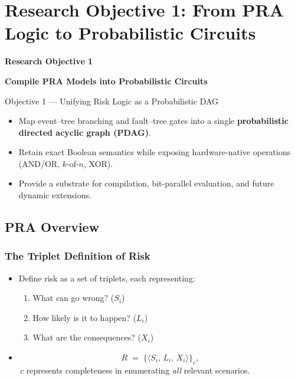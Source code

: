 \section{Research Objective 1: From PRA Logic to Probabilistic Circuits}
\begin{frame}
    \Large{\centerline{\textbf{Research Objective 1}}}
    \vspace{6pt}
    \large{\centerline{\textbf{Compile PRA Models into Probabilistic Circuits}}}
\end{frame}

\begin{frame}{Objective 1 — Unifying Risk Logic as a Probabilistic DAG}
\begin{itemize}[<+->]
  \item Map event–tree branching and fault–tree gates into a single \textbf{probabilistic directed acyclic graph (PDAG)}.
  \item Retain exact Boolean semantics while exposing hardware-native operations (AND/OR, $k$-of-$n$, XOR).
  \item Provide a substrate for compilation, bit-parallel evaluation, and future dynamic extensions.
\end{itemize}
\end{frame}

\subsection{PRA Overview}
\begin{frame}[allowframebreaks]
\frametitle{The Triplet Definition of Risk}
\begin{itemize}
  \item Define risk as a set of triplets, each representing:
    \begin{enumerate}
      \item What can go wrong? (\(S_i\))
      \item How likely is it to happen? (\(L_i\))
      \item What are the consequences? (\(X_i\))
    \end{enumerate}
        \vspace{6pt}
  \item
    \begin{equation}
    \label{eq:risk_triplets_slides}
      R \;=\;\bigl\{\langle S_i,\,L_i,\,X_i\rangle\bigr\}_{c},
    \end{equation}
    \(\,c\) represents completeness in enumerating \emph{all} relevant scenarios.
\end{itemize}
\end{frame}

